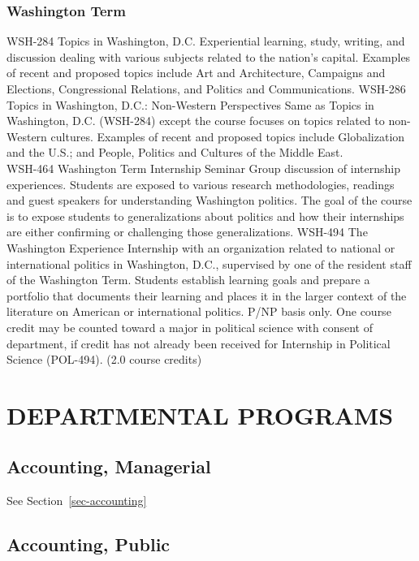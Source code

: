 \documentclass[
  letterpaper,
]{scrbook}
\begin{document}
\subsection{Washington
Term}\label{sec-academic-programs-washington-term}

WSH-284 Topics in Washington, D.C. Experiential learning, study,
writing, and discussion dealing with various subjects related to the
nation's capital. Examples of recent and proposed topics include Art and
Architecture, Campaigns and Elections, Congressional Relations, and
Politics and Communications. WSH-286 Topics in Washington, D.C.:
Non-Western Perspectives Same as Topics in Washington, D.C. (WSH-284)
except the course focuses on topics related to non-Western cultures.
Examples of recent and proposed topics include Globalization and the
U.S.; and People, Politics and Cultures of the Middle East.\\
WSH-464 Washington Term Internship Seminar Group discussion of
internship experiences. Students are exposed to various research
methodologies, readings and guest speakers for understanding Washington
politics. The goal of the course is to expose students to
generalizations about politics and how their internships are either
confirming or challenging those generalizations. WSH-494 The Washington
Experience Internship with an organization related to national or
international politics in Washington, D.C., supervised by one of the
resident staff of the Washington Term. Students establish learning goals
and prepare a portfolio that documents their learning and places it in
the larger context of the literature on American or international
politics. P/NP basis only. One course credit may be counted toward a
major in political science with consent of department, if credit has not
already been received for Internship in Political Science (POL-494).
(2.0 course credits)

\chapter{DEPARTMENTAL PROGRAMS}\label{departmental-programs}

\section{Accounting, Managerial}\label{accounting-managerial}

See Section~\ref{sec-accounting}

\section{Accounting, Public}\label{accounting-public}
\end{document}
